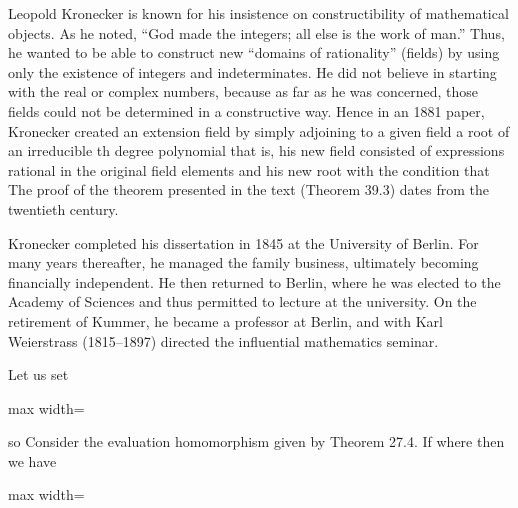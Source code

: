 \documentclass[11pt,oneside]{article}
\begin{document}
\begin{BookBody}
 \BookEnd{\blacksquare}

\noindent Leopold Kronecker is known for his insistence on constructibility of mathematical objects. As he noted, “God made the integers; all else is the work of man.” Thus, he wanted to be able to construct new “domains of rationality” (fields) by using only the existence of integers and indeterminates. He did not believe in starting with the real or complex numbers, because as far as he was concerned, those fields could not be determined in a constructive way. Hence in an 1881 paper, Kronecker created an extension field by simply adjoining to a given field a root \BookInline{\alpha } of an irreducible th degree polynomial  that is, his new field consisted of expressions rational in the original field elements and his new root \BookInline{\alpha } with the condition that  The proof of the theorem presented in the text (Theorem 39.3) dates from the twentieth century.

Kronecker completed his dissertation in 1845 at the University of Berlin. For many years thereafter, he managed the family business, ultimately becoming financially independent. He then returned to Berlin, where he was elected to the Academy of Sciences and thus permitted to lecture at the university. On the retirement of Kummer, he became a professor at Berlin, and with Karl Weierstrass (1815–1897) directed the influential mathematics seminar.

Let us set

\begin{center}\begin{adjustbox}{max width=\linewidth}\end{adjustbox}\end{center}

\noindent so  Consider the evaluation homomorphism  given by Theorem 27.4. If  where  then we have

\begin{center}\begin{adjustbox}{max width=\linewidth}\end{adjustbox}\end{center}


\end{BookBody}
\end{document}
